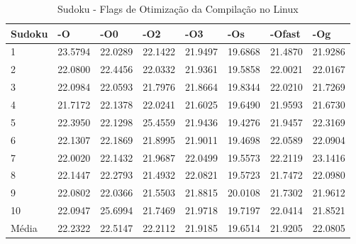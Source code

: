 \begin{table}[!ht]
\centering
\caption{Sudoku - Flags de Otimização da Compilação no Linux}
\label{tab:otimizacao_compilacao:linux:sudoku}
\begin{tabular}{llllllll}
\textbf{Sudoku}            & \textbf{-O}  & \textbf{-O0}   & \textbf{-O2} & \textbf{-O3} & \textbf{-Os} & \textbf{-Ofast} & \textbf{-Og} \\ \toprule
1                          & 23.5794      & 22.0289        & 22.1422      & 21.9497      & 19.6868      & 21.4870         & 21.9286    \\ 
2                          & 22.0800      & 22.4456        & 22.0332      & 21.9361      & 19.5858      & 22.0021         & 22.0167    \\ 
3                          & 22.0984      & 22.0593        & 21.7976      & 21.8664      & 19.8344      & 22.0210         & 21.7269    \\ 
4                          & 21.7172      & 22.1378        & 22.0241      & 21.6025      & 19.6490      & 21.9593         & 21.6730    \\ 
5                          & 22.3950      & 22.1298        & 25.4559      & 21.9436      & 19.4276      & 21.9457         & 22.3169    \\ 
6                          & 22.1307      & 22.1869        & 21.8995      & 21.9011      & 19.4698      & 22.0589         & 22.0904    \\ 
7                          & 22.0020      & 22.1432        & 21.9687      & 22.0499      & 19.5573      & 22.2119         & 23.1416    \\ 
8                          & 22.1447      & 22.2793        & 21.4932      & 22.0821      & 19.5723      & 21.7472         & 22.0980    \\ 
9                          & 22.0802      & 22.0366        & 21.5503      & 21.8815      & 20.0108      & 21.7302         & 21.9612    \\ 
10                         & 22.0947      & 25.6994        & 21.7469      & 21.9718      & 19.7197      & 22.0414         & 21.8521    \\ \bottomrule
Média                      & 22.2322      & 22.5147        & 22.2112      & 21.9185      & 19.6514      & 21.9205         & 22.0805    \\ 
\end{tabular}
\end{table}

